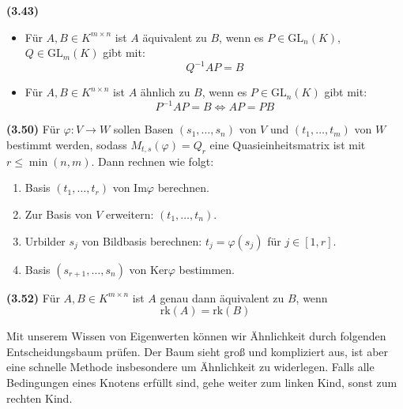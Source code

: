 \documentclass[a4paper,parskip=half*,DIV=15,fontsize=11pt]{scrartcl}
\newlength{\hangwidth}
\newcommand{\skript}[1]{\settowidth{\hangwidth}{\textbf{(#1)} }\hangpara{\hangwidth}{1}\textbf{(#1)} \ignorespaces} %
\newcommand{\rk}{\mathrm{rk}} %
\newcommand{\GL}{\mathrm{GL}} %
\newcommand{\Ker}{\mathrm{Ker}} %
\renewcommand{\Im}{\mathrm{Im}} %
\newcommand{\geo}{\mathrm{g}} %
\newcommand{\mul}{\mathrm{m}} %
\begin{document}
\skript{3.43} \begin{itemize}
	\item Für $A, B \in K^{m \times n}$ ist $A$ äquivalent zu $B$, wenn es $P \in \GL_n(K)$, $Q \in \GL_m(K)$ gibt mit: $$Q^{-1} A P = B$$
	\item Für $A, B \in K^{n \times n}$ ist $A$ ähnlich zu $B$, wenn es $P \in \GL_n(K)$ gibt mit: $$P^{-1} A P = B \iff A P = P B$$
\end{itemize}

\skript{3.50} Für $\varphi : V \to W$ sollen Basen $(s_1, \ldots, s_n)$ von $V$ und $(t_1, \ldots, t_m)$ von $W$ bestimmt werden, sodass $M_{t,s}(\varphi) = Q_r$ eine Quasieinheitsmatrix ist mit $r \leq \min(n, m)$. Dann rechnen wie folgt: \begin{enumerate}
    \item Basis $(t_1, \ldots, t_r)$ von $\Im \varphi$ berechnen.
    \item Zur Basis von $V$ erweitern: $(t_1, \ldots, t_n)$.
    \item Urbilder $s_j$ von Bildbasis berechnen: $t_j = \varphi(s_j)$ für $j \in [1, r]$.
    \item Basis $(s_{r+1}, \ldots, s_n)$ von $\Ker \varphi$ bestimmen.
\end{enumerate}

\skript{3.52} Für $A, B \in K^{m \times n}$ ist $A$ genau dann äquivalent zu $B$, wenn $$\rk(A) = \rk(B)$$

Mit unserem Wissen von Eigenwerten können wir Ähnlichkeit durch folgenden Entscheidungsbaum prüfen. Der Baum sieht groß und kompliziert aus, ist aber eine schnelle Methode insbesondere um Ähnlichkeit zu widerlegen. Falls alle Bedingungen eines Knotens erfüllt sind, gehe weiter zum linken Kind, sonst zum rechten Kind.

\end{document}
